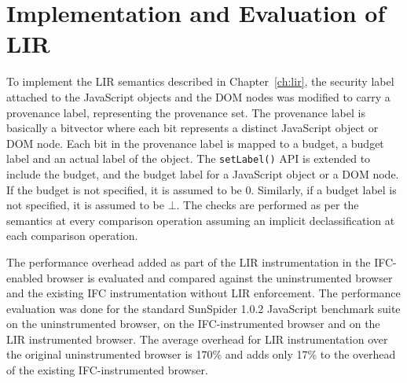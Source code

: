 \section{Implementation and Evaluation of LIR}
\label{sec:impllir}

To implement the LIR semantics described in Chapter~\ref{ch:lir}, the
security label attached to the JavaScript objects and the DOM nodes
was modified to carry a provenance label, representing the provenance
set. The provenance label is basically a bitvector where each bit
represents a distinct JavaScript object or DOM node. Each bit in the
provenance label is mapped to a budget, a budget label and an actual
label of the object. The \texttt{setLabel()} API is extended to
include the budget, and the budget label for a JavaScript object or a
DOM node. If the budget is not specified, it is assumed to be
$0$. Similarly, if a budget label is not specified, it is assumed to
be $\bot$. The checks are performed as per the semantics at every
comparison operation assuming an implicit declassification at 
each comparison operation.

The performance overhead added as part of the LIR instrumentation in
the IFC-enabled browser is evaluated and compared against the
uninstrumented browser and the existing IFC instrumentation without
LIR enforcement. The performance evaluation was done for the standard
SunSpider 1.0.2 JavaScript benchmark suite on the uninstrumented
browser, on the IFC-instrumented browser and on the LIR instrumented
browser. The average overhead for LIR instrumentation over the
original uninstrumented browser is 170\% and adds only 17\% to the
overhead of the existing IFC-instrumented browser.




